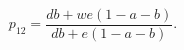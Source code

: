 \begin{equation}
  p_{12} = \frac {
    db + we(1 - a - b)
  } {
    db  + e(1 - a - b)
  }.
  \label{eqn:study-link-function}
\end{equation}